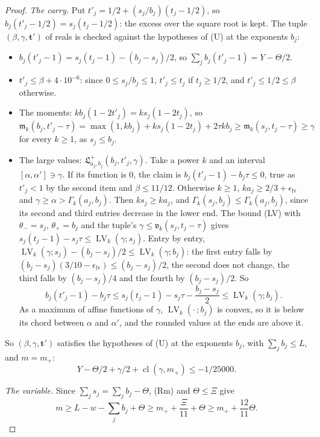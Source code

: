 \documentclass[11pt]{article}
\theoremstyle{definition}
\begin{document}
\begin{proof}
\emph{The carry.} Put $t'_j = 1/2 + (s_j/b_j)(t_j - 1/2)$, so $b_j(t'_j - 1/2) = s_j(t_j - 1/2)$: the excess over the
square root is kept. The tuple $(\beta, \gamma, \mathbf t')$ of reals is checked against the hypotheses of (U) at the
exponents $b_j$:
\begin{itemize}
\item $b_j(t'_j - 1) = s_j(t_j - 1) - (b_j - s_j)/2$, so $\sum_j b_j(t'_j - 1) = Y - \Theta/2$.
\item $t'_j \le \beta + 4 \cdot 10^{-6}$: since $0 \le s_j/b_j \le 1$, $t'_j \le t_j$ if $t_j \ge 1/2$, and $t'_j \le
1/2
  \le \beta$ otherwise.
\item The moments: $kb_j(1 - 2t'_j) = ks_j(1 - 2t_j)$, so
  $\mathfrak m_k(b_j, t'_j - \tau) = \max(1, kb_j) + ks_j(1 - 2t_j) + 2\tau kb_j \ge \mathfrak m_k(s_j, t_j - \tau) \ge
  \gamma$ for every $k \ge 1$, as $s_j \le b_j$.
\item The large values: $\mathfrak L^+_{a_j, b_j}(b_j, t'_j, \gamma)$. Take a power $k$ and an interval $[\alpha,
  \alpha'] \ni \gamma$. If its function is $0$, the claim is $b_j(t'_j - 1) - b_j\tau \le 0$, true as $t'_j < 1$ by the
  second item and $\beta \le 11/12$.
  Otherwise $k \ge 1$, $ka_j \ge 2/3 + \epsilon_{\mathrm{lv}}$ and $\gamma \ge \alpha > \Gamma_k(a_j, b_j)$. Then $ks_j
  \ge ka_j$, and $\Gamma_k(s_j, b_j) \le \Gamma_k(a_j, b_j)$, since its second and third entries decrease in the lower
  end. The bound (LV) with $\theta_- = s_j$, $\theta_+ = b_j$ and the tuple's $\gamma \le \mathfrak v_k(s_j, t_j -
  \tau)$ gives $s_j(t_j - 1) - s_j\tau \le \operatorname{LV}_k(\gamma; s_j)$. Entry by entry,
  $\operatorname{LV}_k(\gamma;
  s_j) - (b_j - s_j)/2 \le \operatorname{LV}_k(\gamma; b_j)$: the first entry falls by $(b_j - s_j)(3/10 -
  \epsilon_{\mathrm{lv}}) \le (b_j - s_j)/2$, the second does not change, the third falls by $(b_j - s_j)/4$ and the
  fourth by $(b_j - s_j)/2$. So
  \[
    b_j(t'_j - 1) - b_j\tau \le s_j(t_j - 1) - s_j\tau - \frac{b_j - s_j}2 \le \operatorname{LV}_k(\gamma; b_j).
  \]
  As a maximum of affine functions of $\gamma$, $\operatorname{LV}_k(\cdot\,; b_j)$ is convex, so it is below its chord
  between $\alpha$ and $\alpha'$, and the rounded values at the ends are above it.
\end{itemize}
So $(\beta, \gamma, \mathbf t')$ satisfies the hypotheses of (U) at the exponents $b_j$, with $\sum_j b_j \le L$, and
$m = m_+$:
\[
  Y - \Theta/2 + \gamma/2 + \operatorname{cl}(\gamma, m_+) \le -1/25000. \tag{b}
\]

\emph{The variable.} Since $\sum_j s_j = \sum_j b_j - \Theta$, (Rm) and $\Theta \le \Xi$ give
\[
  m \ge L - w - \sum_j b_j + \Theta \ge m_+ + \frac\Xi{11} + \Theta \ge m_+ + \frac{12}{11}\Theta.
\]


\end{proof}
\end{document}
